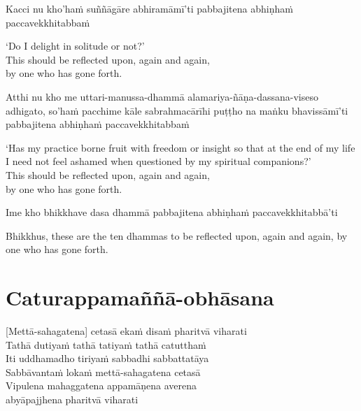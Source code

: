 Kacci nu kho'haṁ suññāgāre abhiramāmī'ti pabbajitena abhiṇhaṁ paccavekkhitabbaṁ

\begin{english}
  `Do I delight in solitude or not?'\\
  This should be reflected upon, again and again,\\
  by one who has gone forth.
\end{english}

Atthi nu kho me uttari-manussa-dhammā alamariya-ñāṇa-dassana-viseso adhigato, so'haṁ pacchime kāle sabrahmacārīhi puṭṭho na maṅku bhavissāmī'ti pabbajitena abhiṇhaṁ paccavekkhitabbaṁ

\begin{english}
  `Has my practice borne fruit with freedom or insight so that at the end of my life I need not feel ashamed when questioned by my spiritual companions?'\\
  This should be reflected upon, again and again,\\
  by one who has gone forth.
\end{english}

Ime kho bhikkhave dasa dhammā pabbajitena abhiṇhaṁ paccavekkhitabbā'ti

\begin{english}
  Bhikkhus, these are the ten dhammas to be reflected upon, again and again, by one who has gone forth.
\end{english}


\section{Caturappamaññā-obhāsana}


\begin{leader}
\end{leader}

[Mettā-sahagatena] cetasā ekaṁ disaṁ pharitvā viharati\\
Tathā dutiyaṁ tathā tatiyaṁ tathā catutthaṁ\\
Iti uddhamadho tiriyaṁ sabbadhi sabbattatāya\\
Sabbāvantaṁ lokaṁ mettā-sahagatena cetasā\\
Vipulena mahaggatena appamāṇena averena\\
abyāpajjhena pharitvā viharati

